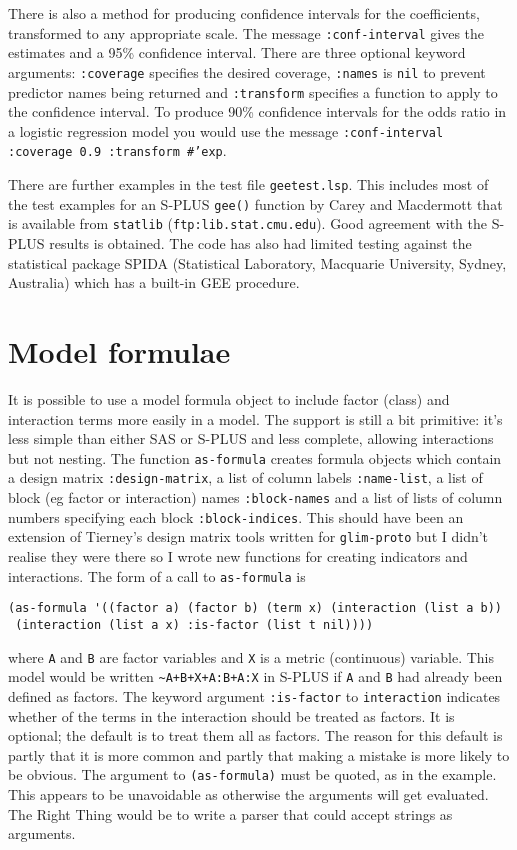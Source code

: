 \documentclass[10pt]{article}
\begin{document}
There is also a method for producing confidence intervals for the coefficients, transformed to any appropriate scale. The message \texttt{:conf-interval} gives the estimates and a 95\% confidence interval. There are three optional keyword arguments: \texttt{:coverage} specifies the desired coverage, \texttt{:names} is \texttt{nil} to prevent predictor names being returned  and \texttt{:transform} specifies a function to apply to the confidence interval. To produce 90\% confidence intervals for the odds ratio in a logistic regression model you would use the message \texttt{:conf-interval :coverage 0.9 :transform \#'exp}. 

There are further examples in the test file \texttt{geetest.lsp}. This includes most of the test examples for an S-PLUS \texttt{gee()} function by Carey and Macdermott that is available from \texttt{statlib} (\texttt{ftp:lib.stat.cmu.edu}). Good agreement with the S-PLUS results is obtained. The code has also had limited testing against the statistical package SPIDA (Statistical Laboratory, Macquarie University, Sydney, Australia) which has a built-in GEE procedure. 

\section{Model formulae}
It is possible to use a model formula object to include factor (class) and interaction terms more easily in a model.  The support is still a bit primitive: it's less simple than either SAS or S-PLUS and less complete, allowing interactions but not nesting. The function \texttt{as-formula} creates formula objects which contain a design matrix \texttt{:design-matrix}, a list of column labels \texttt{:name-list}, a list of block (eg factor or interaction) names \texttt{:block-names} and a list of lists of column numbers specifying each block \texttt{:block-indices}. This should have been an extension of Tierney's design matrix tools written for \texttt{glim-proto} but I didn't realise they were there so I wrote new functions for creating indicators and interactions.  The form of a call to \texttt{as-formula} is 
\begin{verbatim}
(as-formula '((factor a) (factor b) (term x) (interaction (list a b))
 (interaction (list a x) :is-factor (list t nil))))
\end{verbatim}
where \texttt{A} and \texttt{B} are factor variables and \texttt{X} is a metric (continuous) variable.  This model would be written \verb=~A+B+X+A:B+A:X= in S-PLUS if \texttt{A} and \texttt{B} had already been defined as factors. The keyword argument \texttt{:is-factor} to \texttt{interaction} indicates whether of the terms in the interaction should be treated as factors. It is optional; the default is to treat them all as factors. The reason for this default is partly that it is more common and partly that making a mistake is more likely to be obvious.
The argument to \texttt{(as-formula)} must be quoted, as in the example. This appears to be unavoidable as otherwise the arguments will get evaluated. The Right Thing would be to write a parser that could accept strings as arguments.
\end{document}
